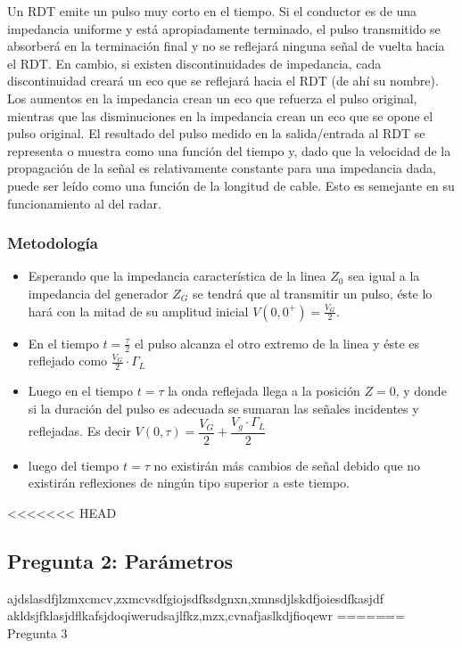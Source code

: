 \documentclass[11pt,onecolumn]{article}
\begin{document}
Un RDT emite un pulso muy corto en el tiempo. Si el conductor es de una impedancia uniforme
y está apropiadamente terminado, el pulso transmitido se absorberá en la terminación final
y no se reflejará ninguna señal de vuelta hacia el RDT. En cambio, si existen
discontinuidades de impedancia, cada discontinuidad creará un eco que se reflejará hacia el
RDT (de ahí su nombre). Los aumentos en la impedancia crean un eco que refuerza el pulso
original, mientras que las disminuciones en la impedancia crean un eco que se opone el
pulso original. El resultado del pulso medido en la salida/entrada al RDT se representa o
muestra como una función del tiempo y, dado que la velocidad de la propagación de la señal
es relativamente constante para una impedancia dada, puede ser leído como una función de la
longitud de cable. Esto es semejante en su funcionamiento al del radar.

\subsubsection*{Metodología}

\begin{itemize}
\item Esperando que la impedancia característica de la linea $Z_{0}$ sea igual a la impedancia del generador $Z_{G}$ se tendrá que al transmitir un pulso, éste lo hará con la mitad de su amplitud inicial $ V(0,0^{+}) = \frac{V_{G}}{2}$. 

\item En el tiempo $t = \frac{\tau}{2}$ el pulso alcanza el otro extremo de la linea y éste es reflejado como $\frac{V_{G}}{2} \cdot \Gamma_{L}$


\item Luego en el tiempo $t = \tau$ la onda reflejada llega a la posición $Z = 0$, y donde si la duración del pulso es adecuada se sumaran las señales incidentes y reflejadas. Es decir $V(0,\tau) = \dfrac{V_{G}}{2} + \dfrac{V_{g}\cdot \Gamma_{L}}{2}$ 

\item luego del tiempo $t = \tau$ no existirán más cambios de señal debido que no existirán reflexiones de ningún tipo superior a este tiempo.

\end{itemize}
<<<<<<< HEAD
\subsection*{Pregunta 2: Parámetros}
ajdslasdfjlzmxcmcv,zxmcvsdfgiojsdfksdgnxn,xmnsdjlskdfjoiesdfkasjdf
akldsjfklasjdflkafsjdoqiwerudsajlfkz,mzx,cvnafjaslkdjfioqewr
=======
Pregunta 3
\end{document}
